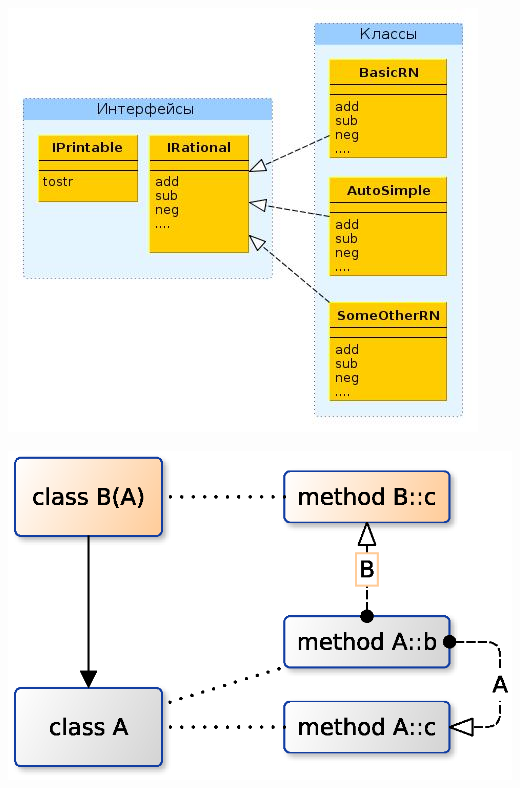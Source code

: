 \documentclass{article}
\begin{document}
\begin{center} \includegraphics[scale=0.8]{images/interfaces.jpg} \end{center} 
\newpage

\begin{center} \includegraphics{images/virt_hierarchi.eps} \end{center} 
\newpage
\end{document}
